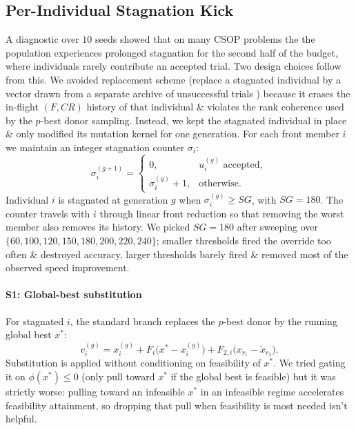 \documentclass[conference]{IEEEtran}
\begin{document}
\subsection{Per-Individual Stagnation Kick}
\label{sec:psk}
A diagnostic over $10$ seeds showed that on many CSOP problems the the population experiences prolonged stagnation for the second half of the budget, where individuals rarely contribute an accepted trial. Two design choices follow from this. We avoided \cite{trivedi2024ude} replacement scheme (replace a stagnated individual by a vector drawn from a separate archive of unsuccessful trials \cite{trivedi2024ude}) because it erases the in-flight $(F, CR)$ history of that individual \& violates the rank coherence used by the $p$-best donor sampling. Instead, we kept the stagnated individual in place \& only modified its mutation kernel for one generation. For each front member $i$ we maintain an integer stagnation counter $\sigma_i$:
\begin{equation}
\sigma_i^{(g+1)} =
\begin{cases}
0, & u_i^{(g)} \text{ accepted}, \\
\sigma_i^{(g)} + 1, & \text{otherwise}.
\end{cases}
\label{eq:counter}
\end{equation}
Individual $i$ is stagnated at generation $g$ when $\sigma_i^{(g)} \ge SG$, with $SG = 180$. The counter travels with $i$ through linear front reduction so that removing the worst member also removes its history. We picked $SG = 180$ after sweeping over $\{60, 100, 120, 150, 180, 200, 220, 240\}$; smaller thresholds fired the override too often \& destroyed accuracy, larger thresholds barely fired \& removed most of the observed speed improvement.

\paragraph*{S1: Global-best substitution}
For stagnated $i$, the standard branch replaces the $p$-best donor by the running global best $x^{*}$:
\begin{equation}
v_i^{(g)} = x_i^{(g)} + F_i\!\big(x^{*} - x_i^{(g)}\big) + F_{2,i}\!\big(x_{r_1} - \tilde{x}_{r_2}\big).
\label{eq:override1}
\end{equation}
Substitution is applied without conditioning on feasibility of $x^{*}$. We tried gating it on $\phi(x^{*}) \le 0$ (only pull toward $x^{*}$ if the global best is feasible) but it was strictly worse: pulling toward an infeasible $x^{*}$ in an infeasible regime accelerates feasibility attainment, so dropping that pull when feasibility is most needed isn't helpful.
\end{document}
